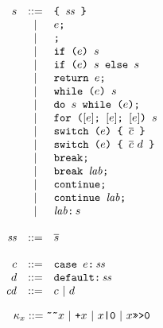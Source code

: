 \documentclass{article}
\newcommand{\seq}[1]{\overline{{#1}}}
\newcommand{\mathjs}[1]{\mbox{\texttt{{#1}}}}
\newcommand{\return}[1]{\mathjs{return }{#1}\mathjs{;}}
\newcommand{\while}[2]{\mathjs{while (}{#1}\mathjs{) }{#2}}
\newcommand{\dowhile}[2]{\mathjs{do }{#1}\mathjs{ while (}{#2}\mathjs{);}}
\newcommand{\for}[4]{\mathjs{for (}{#1}\mathjs{; }{#2}\mathjs{; }{#3}\mathjs{) }{#4}}
\newcommand{\switch}[2]{\mathjs{switch (}{#1}\mathjs{) \char123{} }{#2}\mathjs{ \char125{}}}
\newcommand{\brk}{\mathjs{break;}}
\newcommand{\brkl}[1]{\mathjs{break }{#1}\mathjs{;}}
\newcommand{\cont}{\mathjs{continue;}}
\newcommand{\contl}[1]{\mathjs{continue }{#1}\mathjs{;}}
\newcommand{\lab}[2]{{#1}\mathjs{:}\,{#2}}
\newcommand{\ifthen}[2]{\mathjs{if (}{#1}\mathjs{) }{#2}}
\newcommand{\ifthenelse}[3]{\mathjs{if (}{#1}\mathjs{) }{#2}\mathjs{ else }{#3}}
\newcommand{\block}[1]{\mathjs{\char123{} }{#1}\mathjs{ \char125{}}}
\newcommand{\toint}[1]{\mathjs{\~{}\~{}}{#1}}
\newcommand{\todouble}[1]{\mathjs{+}{#1}}
\begin{document}
\[
\begin{array}{rcl}
s & ::= & \block{\mathit{ss}} \\
  &  |  & e\mathjs{;} \\
  &  |  & \mathjs{;} \\
  &  |  & \ifthen{e}{s} \\
  &  |  & \ifthenelse{e}{s}{s} \\
  &  |  & \return{e} \\
  &  |  & \while{e}{s} \\
  &  |  & \dowhile{s}{e} \\
  &  |  & \for{[e]}{[e]}{[e]}{s} \\
  &  |  & \switch{e}{\seq{c}} \\
  &  |  & \switch{e}{\seq{c}\ d} \\
  &  |  & \brk \\
  &  |  & \brkl{\mathit{lab}} \\
  &  |  & \cont \\
  &  |  & \contl{\mathit{lab}} \\
  &  |  & \lab{\mathit{lab}}{s} \\
\\
\mathit{ss} & ::= & \seq{s} \\
\\
c & ::= & \mathjs{case }e\mathjs{:}\,\mathit{ss} \\
d & ::= & \mathjs{default:}\,\mathit{ss} \\
\mathit{cd} & ::= & c ~|~ d \\
\end{array}
\]

\[
\kappa_x ::= \toint{x} ~|~ \todouble{x} ~|~ x\mathjs{|0} ~|~ x\mathjs{>>>0} \\
\]
\end{document}
